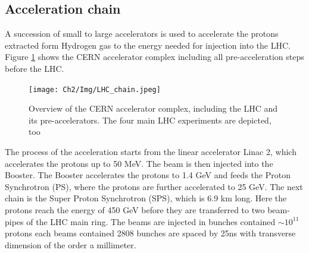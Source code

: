\subsection{Acceleration chain}
\label{chap2:LHC:chain}
A succession of small to large accelerators is used to accelerate the protons extracted form Hydrogen gas to the energy needed for injection into the LHC. Figure \ref{fig:chap2:LHC:chain} shows the CERN accelerator complex including all pre-acceleration steps before the LHC.
\begin{figure}[ht]
    \centering
    \texttt{[image: Ch2/Img/LHC\_chain.jpeg]}
    \caption{Overview of the CERN accelerator complex, including the LHC and its pre-accelerators. The four main LHC experiments are depicted, too}
    \label{fig:chap2:LHC:chain}
\end{figure}
The process of the acceleration starts from the linear accelerator Linac 2, which accelerates the protons up to 50 MeV. The beam is then injected into the Booster. The Booster accelerates the protons to 1.4 GeV and feeds the Proton Synchrotron (PS), where the protons are further accelerated to 25 GeV. The next chain is the Super Proton Synchrotron (SPS), which is 6.9 km long. Here the protons reach the energy of 450 GeV before they are transferred to two beam-pipes of the LHC main ring. The beams are injected in bunches contained $\sim 10^{11}$ protons each beams contained 2808 bunches are spaced by 25ns with transverse dimension of the order a millimeter. 
